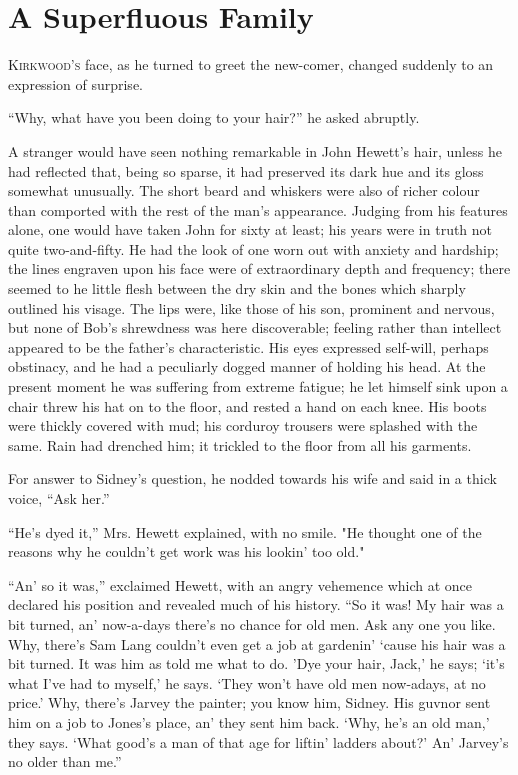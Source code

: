 \chapter{A Superfluous Family}

\textsc{Kirkwood's} face, as he turned to greet the new-comer, changed
suddenly to an expression of surprise.

``Why, what have you been doing to your hair?'' he asked abruptly.

A stranger would have seen nothing remarkable in John Hewett's hair,
unless he had reflected that, being so sparse, it had preserved its dark
hue and its gloss somewhat unusually. The short beard and whiskers were
also of richer colour than comported with the rest of the man's
appearance. Judging from his features alone, one would have taken John
for sixty at least; his years were in truth not quite two-and-fifty. He
had the look of one worn out with anxiety
{\protect\hypertarget{46}{}{}}and hardship; the lines engraven upon his
face were of extraordinary depth and frequency; there seemed to he
little flesh between the dry skin and the bones which sharply outlined
his visage. The lips were, like those of his son, prominent and nervous,
but none of Bob's shrewdness was here discoverable; feeling rather than
intellect appeared to be the father's characteristic. His eyes expressed
self-will, perhaps obstinacy, and he had a peculiarly dogged manner of
holding his head. At the present moment he was suffering from extreme
fatigue; he let himself sink upon a chair threw his hat on to the floor,
and rested a hand on each knee. His boots were thickly covered with mud;
his corduroy trousers were splashed with the same. Rain had drenched
him; it trickled to the floor from all his garments.

For answer to Sidney's question, he nodded towards his wife and said in
a thick voice, ``Ask her.''

``He's dyed it,'' Mrs. Hewett explained, with no smile. "He thought one
of the {\protect\hypertarget{47}{}{}}reasons why he couldn't get work
was his lookin' too old."

``An' so it was,'' exclaimed Hewett, with an angry vehemence which at
once declared his position and revealed much of his history. ``So it
was! My hair was a bit turned, an' now-a-days there's no chance for old
men. Ask any one you like. Why, there's Sam Lang couldn't even get a job
at gardenin' `cause his hair was a bit turned. It was him as told me
what to do. 'Dye your hair, Jack,' he says; `it's what I've had to
myself,' he says. `They won't have old men now-adays, at no price.' Why,
there's Jarvey the painter; you know him, Sidney. His guvnor sent him on
a job to Jones's place, an' they sent him back. `Why, he's an old man,'
they says. `What good's a man of that age for liftin' ladders about?'
An' Jarvey's no older than me.''

